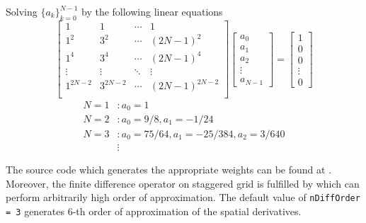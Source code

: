 \documentclass[11pt]{article}
\theoremstyle{plain}
\theoremstyle{definition}
\theoremstyle{remark}
\numberwithin{equation}{section}
\begin{document}
Solving $\{a_k\}_{k=0}^{N-1}$ by the following linear equations
\begin{equation*}
\begin{bmatrix}
  1 & 1 & \cdots & 1 \\
  1^2 & 3^2 & \cdots & (2N-1)^2 \\
  1^4 & 3^4 & \cdots & (2N-1)^4 \\
  \vdots & \vdots & \ddots & \vdots \\
  1^{2N-2} & 3^{2N-2} & \cdots & (2N-1)^{2N-2} \\
\end{bmatrix}
\begin{bmatrix}
  a_0 \\ a_1 \\ a_2 \\ \vdots \\ a_{N-1}
\end{bmatrix}
=
\begin{bmatrix}
  1 \\ 0 \\ 0 \\ \vdots \\ 0
\end{bmatrix}
\end{equation*}
\begin{equation*}
  \begin{aligned}
  N = 1&: a_0 = 1\\
  N = 2&: a_0 = 9/8, a_1 = -1/24\\
  N = 3&: a_0 = 75/64, a_1 = -25/384, a_2 = 3/640\\
  &\vdots
  \end{aligned}
\end{equation*}

The source code which generates the appropriate weights can be found at . Moreover, the finite difference operator on staggered grid is fulfilled by  which can perform arbitrarily high order of approximation. The default value of \texttt{nDiffOrder = 3} generates 6-th order of approximation of the spatial derivatives.
\end{document}
